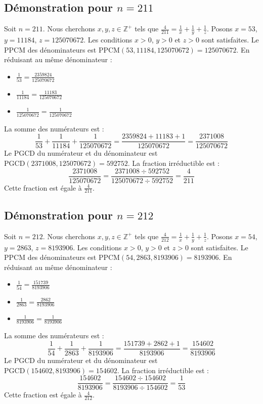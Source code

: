 \documentclass[11pt,a4paper]{article}
\begin{document}
\subsection{Démonstration pour $n = 211$}
Soit $n = 211$. Nous cherchons $x, y, z \in \mathbb{Z}^{+}$ tels que $\frac{4}{211} = \frac{1}{x} + \frac{1}{y} + \frac{1}{z}$.
Posons $x = 53$, $y = 11184$, $z = 125070672$.
Les conditions $x > 0$, $y > 0$ et $z > 0$ sont satisfaites.
Le PPCM des dénominateurs est $\text{PPCM}(53, 11184, 125070672) = 125070672$.
En réduisant au même dénominateur :
\begin{itemize}
    \item $\frac{1}{53} = \frac{2359824}{125070672}$
    \item $\frac{1}{11184} = \frac{11183}{125070672}$
    \item $\frac{1}{125070672} = \frac{1}{125070672}$
\end{itemize}
La somme des numérateurs est :
$$ \frac{1}{53} + \frac{1}{11184} + \frac{1}{125070672} = \frac{2359824 + 11183 + 1}{125070672} = \frac{2371008}{125070672} $$
Le PGCD du numérateur et du dénominateur est $\text{PGCD}(2371008, 125070672) = 592752$.
La fraction irréductible est :
$$ \frac{2371008}{125070672} = \frac{2371008 \div 592752}{125070672 \div 592752} = \frac{4}{211} $$
Cette fraction est égale à $\frac{4}{211}$.

\subsection{Démonstration pour $n = 212$}
Soit $n = 212$. Nous cherchons $x, y, z \in \mathbb{Z}^{+}$ tels que $\frac{4}{212} = \frac{1}{x} + \frac{1}{y} + \frac{1}{z}$.
Posons $x = 54$, $y = 2863$, $z = 8193906$.
Les conditions $x > 0$, $y > 0$ et $z > 0$ sont satisfaites.
Le PPCM des dénominateurs est $\text{PPCM}(54, 2863, 8193906) = 8193906$.
En réduisant au même dénominateur :
\begin{itemize}
    \item $\frac{1}{54} = \frac{151739}{8193906}$
    \item $\frac{1}{2863} = \frac{2862}{8193906}$
    \item $\frac{1}{8193906} = \frac{1}{8193906}$
\end{itemize}
La somme des numérateurs est :
$$ \frac{1}{54} + \frac{1}{2863} + \frac{1}{8193906} = \frac{151739 + 2862 + 1}{8193906} = \frac{154602}{8193906} $$
Le PGCD du numérateur et du dénominateur est $\text{PGCD}(154602, 8193906) = 154602$.
La fraction irréductible est :
$$ \frac{154602}{8193906} = \frac{154602 \div 154602}{8193906 \div 154602} = \frac{1}{53} $$
Cette fraction est égale à $\frac{4}{212}$.
\end{document}
